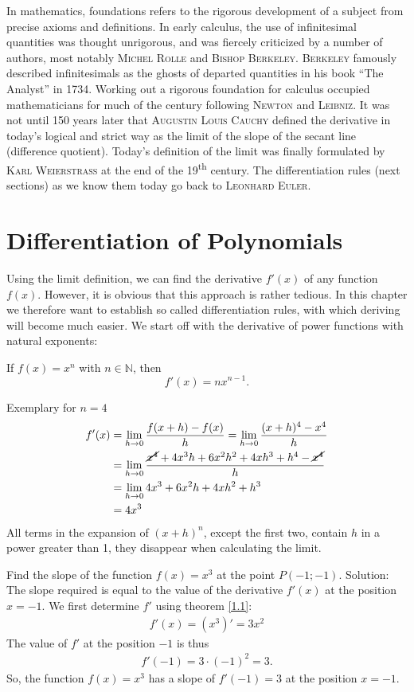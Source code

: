 \documentclass[12pt,eng]{skript_ogg}
\begin{document}
In mathematics, foundations refers to the rigorous development of a subject from precise axioms and definitions. In early calculus, the use of infinitesimal quantities was thought unrigorous, and was fiercely criticized by a number of authors, most notably \textsc{Michel Rolle} and \textsc{Bishop Berkeley}. \textsc{Berkeley} famously described infinitesimals as the ghosts of departed quantities in his book ``The Analyst'' in 1734. Working out a rigorous foundation for calculus occupied mathematicians for much of the century following \textsc{Newton} and \textsc{Leibniz}. It was not until 150 years later that \textsc{Augustin Louis Cauchy} defined the derivative in today's logical and strict way as the limit of the slope of the secant line (difference quotient). Today's definition of the limit was finally formulated by \textsc{Karl Weierstrass} at the end of the 19\textsuperscript{th} century. The differentiation rules (next sections) as we know them today go back to \textsc{Leonhard Euler}.

\newpage

\section{Differentiation of Polynomials}
Using the limit definition, we can find the derivative $f'(x)$ of any function $f(x)$. However, it is obvious that this approach is rather tedious. In this chapter we therefore want to establish so called differentiation rules, with which deriving will become much easier. We start off with the derivative of power functions with natural exponents:
\begin{satz}\label{1.1} If $f(x)=x^n$ with $n\in\mathbb{N}$, then 
\[f'(x)=nx^{n-1}.\]
\end{satz}
\begin{beweis}
Exemplary for $n=4$
\begin{align*}
f'(x)&=\lim_{h\rightarrow
  0}\frac{f(x+h)-f(x)}{h}=\lim_{h\rightarrow
  0}\frac{(x+h)^4-x^4}{h} \\
&=\lim_{h\rightarrow
  0}\frac{\cancel{x^4}+4x^{3}h+6x^2h^2+4xh^3+h^4-\cancel{x^4}}{h}
\\
&=\lim_{h\rightarrow 0}4x^{3}+6x^2h+4xh^2+h^3 \\
&=4x^3
\end{align*}
All terms in the expansion of $(x+h)^n$, except the first two, contain $h$ in a power greater than 1, they disappear when calculating the limit.
\end{beweis}
\begin{beispiel}
Find the slope of the function $f(x)=x^3$ at the point $P(-1;-1)$. Solution: The slope required is equal to the value of the derivative $f'(x)$ at the position $x=-1$. We first determine $f'$ using theorem \ref{1.1}:
\begin{align*}
f'(x)=\left( x^3\right)'=3x^2
\end{align*}
The value of $f'$ at the position $-1$ is thus
\begin{align*}
f'(-1)=3\cdot (-1)^2=3.
\end{align*}
So, the function $f(x)=x^3$ has a slope of $f'(-1)=3$ at the position $x=-1$.
\end{beispiel}
\end{document}
